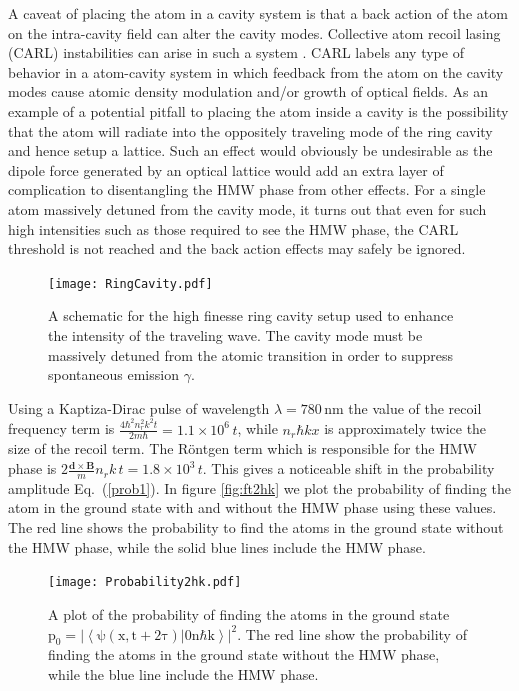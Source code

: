 \documentclass[twocolumn,english,pra,aps,superscriptaddress,floatfix]{revtex4-1}
\begin{document}
A caveat of placing the atom in a cavity system is that a back action of the atom on the intra-cavity field can alter the cavity modes. Collective atom recoil lasing (CARL) instabilities can arise in such a system \cite{courteille}.  CARL labels any type of behavior in a atom-cavity system in which feedback from the atom on the cavity modes cause atomic density modulation and/or growth of optical fields.  As an example of a potential pitfall to placing the atom inside a cavity is the possibility that the atom will radiate into the oppositely traveling mode of the ring cavity and hence setup a lattice.  Such an effect would obviously be undesirable as the dipole force generated by an optical lattice would add an extra layer of complication to disentangling the HMW phase from other effects.  For a single atom massively detuned from the cavity mode, it turns out that even for such high intensities such as those required to see the HMW phase, the CARL threshold is not reached \cite{hemmerich} and the back action effects may safely be ignored.  
\begin{figure}
\texttt{[image: RingCavity.pdf]}
\caption{A schematic for the high finesse ring cavity setup used to enhance the intensity of the traveling wave. The cavity mode must be massively detuned from the atomic transition in order to suppress spontaneous emission $\gamma$. } 
\label{fig:ringcavity}
\end{figure}

Using a Kaptiza-Dirac pulse of wavelength $\lambda=780\,\mathrm{nm}$ the value of the recoil frequency term is $\frac{4\hbar^2n_r^2k^2t}{2m\hbar}=1.1\times 10^6\, t$, while $n_r\hbar kx$ is approximately twice the size of the recoil term. The R\"{o}ntgen term which is responsible for the HMW phase is  $2\frac{\mathbf{d}\times\mathbf{B}}{m}n_rk\,t=1.8\times10^3\,t$.  This gives  a noticeable shift in the probability amplitude Eq.\ (\ref{prob1}).
In figure \ref{fig:ft2hk} we plot the probability of finding the atom in the ground state with and without the HMW phase using these values. The red line shows the probability to find the atoms in the ground state without the HMW phase, while the solid blue lines include the HMW phase.
\begin{figure}
\texttt{[image: Probability2hk.pdf]}
\caption{A plot of the probability of finding the atoms in the ground state $\mathrm{p_0=|\left<\psi(x,t+2\tau)|0n\hbar k\right>|^2}$. The red line show the probability of finding the atoms in the ground state without the HMW phase, while the blue line include the HMW phase.} 
\label{fig:prob}
\end{figure}
\end{document}
